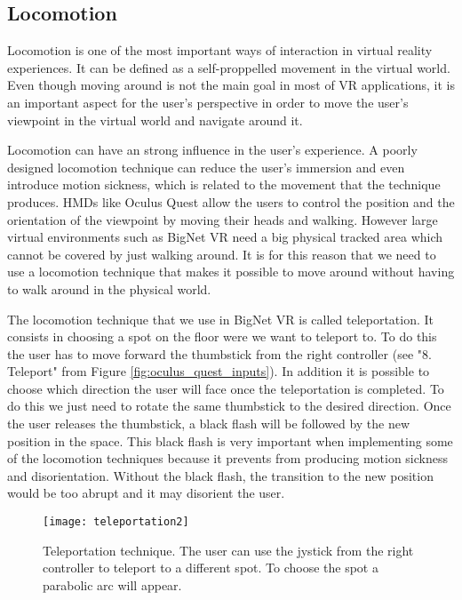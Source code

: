 \subsection{Locomotion}
Locomotion is one of the most important ways of interaction in virtual reality experiences. It can be defined as a self-proppelled movement in the virtual world. Even though moving around is not the main goal in most of VR applications, it is an important aspect for the user's perspective in order to move the user's viewpoint in the virtual world and navigate around it.

Locomotion can have an strong influence in the user's experience. A poorly designed locomotion technique can reduce the user's immersion and even introduce motion sickness, which is related to the movement that the technique produces. HMDs like Oculus Quest allow the users to control the position and the orientation of the viewpoint by moving their heads and walking. However large virtual environments such as BigNet VR need a big physical tracked area which cannot be covered by just walking around. It is for this reason that we need to use a locomotion technique that makes it possible to move around without having to walk around in the physical world\cite{locomotion_technique}.

The locomotion technique that we use in BigNet VR is called teleportation. It consists in choosing a spot on the floor were we want to teleport to. To do this the user has to move forward the thumbstick from the right controller (see "8. Teleport" from Figure \ref{fig:oculus_quest_inputs}). In addition it is possible to choose which direction the user will face once the teleportation is completed. To do this we just need to rotate the same thumbstick to the desired direction. Once the user releases the thumbstick, a black flash will be followed by the new position in the space. This black flash is very important when implementing some of the locomotion techniques because it prevents from producing motion sickness and disorientation. Without the black flash, the transition to the new position would be too abrupt and it may disorient the user.

\begin{figure}[h!]
    \centering%
    \texttt{[image: teleportation2]}
    \caption{Teleportation technique. The user can use the jystick from the right controller to teleport to a different spot. To choose the spot a parabolic arc will appear.}
    \label{fig:teleportation}
\end{figure}%

